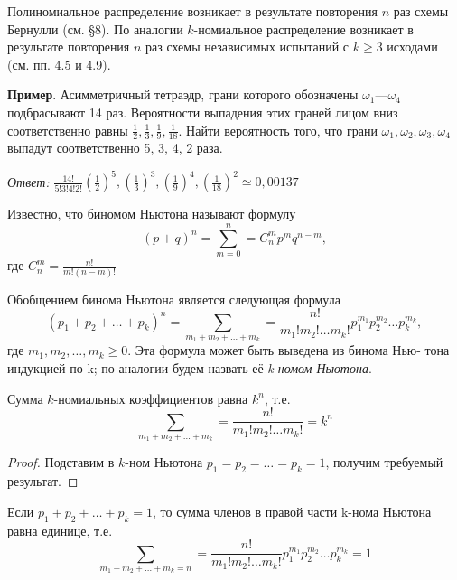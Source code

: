 
Полиномиальное распределение возникает в результате повторения $n$ раз
схемы Бернулли (см. §8). По аналогии $k$-номиальное распределение возникает в результате повторения $n$ раз схемы независимых испытаний с $k \geqslant 3$
исходами (см. пп. 4.5 и 4.9).

\textbf{Пример}. Асимметричный тетраэдр, грани которого обозначены $\omega_1$---$\omega_4$ подбрасывают 14 раз. Вероятности выпадения этих граней лицом вниз
соответственно равны $\frac{1}{2},\frac{1}{3},\frac{1}{9},\frac{1}{18}$. Найти вероятность того, что грани $\omega_1, \omega_2, \omega_3, \omega_4$ выпадут соответственно 5, 3, 4, 2 раза.

\textit{Ответ: }$\frac{14!}{5!3!4!2!}(\frac{1}{2})^5,(\frac{1}{3})^3,(\frac{1}{9})^4,(\frac{1}{18})^2\simeq0,00137$

\begin{zam}
\label{zam:9.1}
	Известно, что биномом Ньютона называют формулу
	\begin{equation*}
		(p+q)^n	=\sum\limits^n_{m=0}=C_n^mp^mq^{n-m},
	\end{equation*}
	где $C_n^m=\frac{n!}{m!(n-m)!}$


Обобщением бинома Ньютона является следующая формула
\begin{equation*}
	(p_1+p_2+\dots+ p_k)^n=\sum\limits_{m_1+m_2+\dots+m_k}=\frac{n!}{m_1!m_2!\dots m_k!}p_1^{m_1}p_2^{m_2}\dots p_k^{m_k},
\end{equation*}
где $m_1, m_2,\dots, m_k \geqslant 0$. Эта формула может быть выведена из бинома Нью-
тона индукцией по k; по аналогии будем назвать её \textit{k-номом Ньютона}.

\end{zam}

\begin{lemma}
\label{lemma:9.2}

	Сумма $k$-номиальных коэффициентов равна $k^n$, т.е.
	\begin{equation*}
		\sum\limits_{m_1+m_2+\dots+m_k}=\frac{n!}{m_1!m_2!\dots m_k!}=k^n
	\end{equation*}

\end{lemma}

\begin{proof}
Подставим в $k$-ном Ньютона $p_1 = p_2 = \dots = p_k = 1$,
получим требуемый результат.
\end{proof}

\begin{lemma}
\label{lemma:9.3}

	Если $p_1+p_2+\dots+p_k = 1$, то сумма членов в правой части
k-нома Ньютона равна единице, т.е.
\begin{equation*}
	\sum\limits_{m_1+m_2+\dots+m_k=n}=\frac{n!}{m_1!m_2!\dots m_k!}p_1^{m_1}p_2^{m_2}\dots p_k^{m_k}=1
\end{equation*}
\end{lemma}

